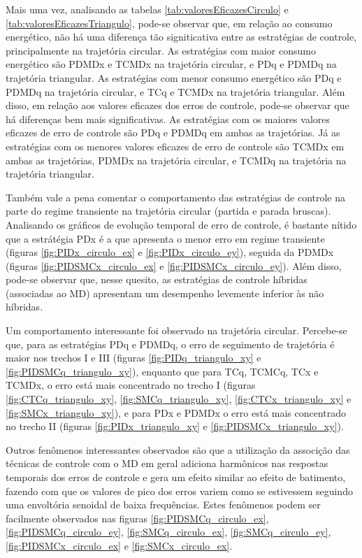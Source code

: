 \documentclass[]{politex}
\begin{document}
Mais uma vez, analisando as tabelas \ref{tab:valoresEficazesCirculo} e \ref{tab:valoresEficazesTriangulo}, pode-se observar que, em relação ao consumo energético, não há uma diferença tão signiticativa entre as estratégias de controle, principalmente na trajetória circular. As estratégias com maior consumo energético são PDMDx e TCMDx na trajetória circular, e PDq e PDMDq na trajetória triangular. As estratégias com menor consumo energético são PDq e PDMDq na trajetória circular, e TCq e TCMDx na trajetória triangular. Além disso, em relação aos valores eficazes dos erros de controle, pode-se observar que há diferenças bem mais significativas. As estratégias com os maiores valores eficazes de erro de controle são PDq e PDMDq em ambas as trajetórias. Já as estratégias com os menores valores eficazes de erro de controle são TCMDx em ambas as trajetórias, PDMDx na trajetória circular, e TCMDq na trajetória na trajetória triangular.

Também vale a pena comentar o comportamento das estratégias de controle na parte do regime transiente na trajetória circular (partida e parada bruscas). Analisando os gráficos de evolução temporal de erro de controle, é bastante nítido que a estrátégia PDx é a que apresenta o menor erro em regime transiente (figuras \ref{fig:PIDx_circulo_ex} e \ref{fig:PIDx_circulo_ey}), seguida da PDMDx (figuras \ref{fig:PIDSMCx_circulo_ex} e \ref{fig:PIDSMCx_circulo_ey}). Além disso, pode-se observar que, nesse quesito, as estratégias de controle híbridas (associadas ao MD) apresentam um desempenho levemente inferior às não híbridas.

Um comportamento interessante foi observado na trajetória circular. Percebe-se que, para as estratégias PDq e PDMDq, o erro de seguimento de trajetória é maior nos trechos I e III (figuras \ref{fig:PIDq_triangulo_xy} e \ref{fig:PIDSMCq_triangulo_xy}), enquanto que para TCq, TCMCq, TCx e TCMDx, o erro está mais concentrado no trecho I (figuras \ref{fig:CTCq_triangulo_xy}, \ref{fig:SMCq_triangulo_xy}, \ref{fig:CTCx_triangulo_xy} e \ref{fig:SMCx_triangulo_xy}), e para PDx e PDMDx o erro está mais concentrado no trecho II (figuras \ref{fig:PIDx_triangulo_xy} e \ref{fig:PIDSMCx_triangulo_xy}).

Outros fenômenos interessantes observados são que a utilização da associção das técnicas de controle com o MD em geral adiciona harmônicos nas respostas temporais dos erros de controle e gera um efeito similar ao efeito de batimento, fazendo com que os valores de pico dos erros variem como se estivessem seguindo uma envoltória senoidal de baixa frequências. Estes fenômenos podem ser facilmente observados nas figuras \ref{fig:PIDSMCq_circulo_ex}, \ref{fig:PIDSMCq_circulo_ey}, \ref{fig:SMCq_circulo_ex}, \ref{fig:SMCq_circulo_ey}, \ref{fig:PIDSMCx_circulo_ex} e \ref{fig:SMCx_circulo_ex}.
\end{document}
